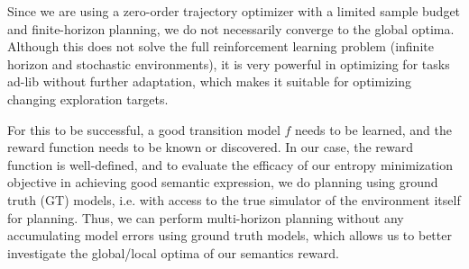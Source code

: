 Since we are using a zero-order trajectory optimizer with a limited sample budget and finite-horizon planning, we do not necessarily converge to the global optima.
Although this does not solve the full reinforcement learning problem (infinite horizon and stochastic environments), it is very powerful in optimizing for tasks ad-lib without further adaptation, which makes it suitable for optimizing changing exploration targets.

For this to be successful, a good transition model \(f\) needs to be learned, and the reward function needs to be known or discovered.
In our case, the reward function is well-defined, and to evaluate the efficacy of our entropy minimization objective in achieving good semantic expression,
we do planning using ground truth (GT) models, i.e. with access to the true simulator of the environment itself for planning.
Thus, we can perform multi-horizon planning without any accumulating model errors using ground truth models, which allows us to better investigate the global/local optima of our semantics reward. 


